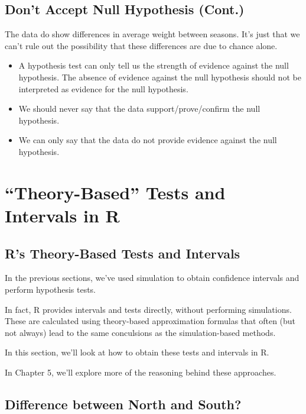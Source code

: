 \documentclass[]{book}
\begin{document}
\subsection{Don't Accept Null Hypothesis
(Cont.)}\label{dont-accept-null-hypothesis-cont.}

The data do show differences in average weight between seasons. It's
just that we can't rule out the possibility that these differences are
due to chance alone.

\begin{itemize}
\item
  A hypothesis test can only tell us the strength of evidence against
  the null hypothesis. The absence of evidence against the null
  hypothesis should not be interpreted as evidence for the null
  hypothesis.
\item
  We should never say that the data support/prove/confirm the null
  hypothesis.
\item
  We can only say that the data do not provide evidence against the null
  hypothesis.
\end{itemize}

\section{\texorpdfstring{``Theory-Based'' Tests and Intervals in
R}{Theory-Based Tests and Intervals in R}}\label{theory-based-tests-and-intervals-in-r}

\subsection{R's Theory-Based Tests and
Intervals}\label{rs-theory-based-tests-and-intervals}

In the previous sections, we've used simulation to obtain confidence
intervals and perform hypothesis tests.

In fact, R provides intervals and tests directly, without performing
simulations. These are calculated using theory-based approximation
formulas that often (but not always) lead to the same conculsions as the
simulation-based methods.

In this section, we'll look at how to obtain these tests and intervals
in R.

In Chapter 5, we'll explore more of the reasoning behind these
approaches.

\subsection{Difference between North and
South?}\label{difference-between-north-and-south-1}
\end{document}
